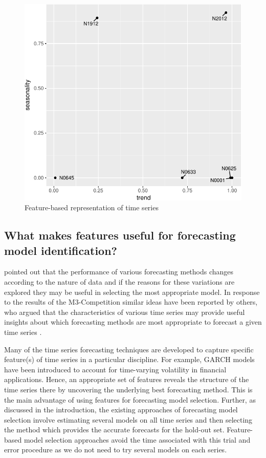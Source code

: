 \documentclass[11pt,a4paper,]{article}
\theoremstyle{definition}
\theoremstyle{definition}
\theoremstyle{definition}
\theoremstyle{remark}
\begin{document}
\begin{figure}

{\centering \includegraphics[width=0.7\linewidth]{figure/fig2-1} 

}

\caption{Feature-based representation of time series\label{features1}}\label{fig:fig2}
\end{figure}

\subsection{What makes features useful for forecasting model
identification?}\label{what-makes-features-useful-for-forecasting-model-identification}

\textcite{reid1972comparison} pointed out that the performance of
various forecasting methods changes according to the nature of data and
if the reasons for these variations are explored they may be useful in
selecting the most appropriate model. In response to the results of the
M3-Competition \autocite{makridakis2000m3} similar ideas have been
reported by others, who argued that the characteristics of various time
series may provide useful insights about which forecasting methods are
most appropriate to forecast a given time series
\autocites{hyndman2001s}{lawrence2001s}{armstrong2001s}.

Many of the time series forecasting techniques are developed to capture
specific feature(s) of time series in a particular discipline. For
example, GARCH models have been introduced to account for time-varying
volatility in financial applications. Hence, an appropriate set of
features reveals the structure of the time series there by uncovering
the underlying best forecasting method. This is the main advantage of
using features for forecasting model selection. Further, as discussed in
the introduction, the existing approaches of forecasting model selection
involve estimating several models on all time series and then selecting
the method which provides the accurate forecasts for the hold-out set.
Feature-based model selection approaches avoid the time associated with
this trial and error procedure as we do not need to try several models
on each series.
\end{document}

